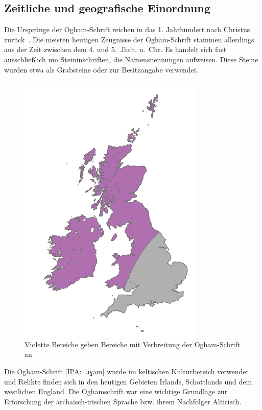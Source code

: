 \documentclass[a4paper]{scrartcl}
\begin{document}
\subsection{Zeitliche und geografische Einordnung}
%
Die Ursprünge der Ogham-Schrift reichen in das 1. Jahrhundert nach Christus zurück~\cite{ogham-heidnisch1}.
Die meisten heutigen Zeugnisse der Ogham-Schrift stammen allerdings aus der Zeit zwischen dem 4. und 5.~Jhdt. n.~Chr.
Es handelt sich fast ausschließlich um Steininschriften, die Namensnennungen aufweisen. Diese Steine wurden etwa als Grabsteine oder zur Besitzangabe verwendet.

\begin{figure}[t]
  \begin{center}
    \includegraphics{images/ogham_areas.pdf}
    \caption{Violette Bereiche geben Bereiche mit Verbreitung der Ogham-Schrift an}
  \end{center}
\end{figure}

Die Ogham-Schrift [{\footnotesize IPA:} {\ipafont ˈɔɣam}] wurde im keltischen Kulturbereich verwendet und Relikte finden sich in den heutigen Gebieten Irlands, Schottlands und dem westlichen England. Die Oghamschrift war eine wichtige Grundlage zur Erforschung der archaisch-irischen Sprache bzw. ihrem Nachfolger Altirisch.
\end{document}

